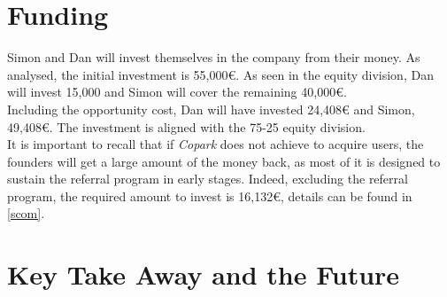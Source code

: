 \documentclass[12pt,a4paper,oneside]{book}
\newcommand{\bp}{\textit{Copark}}
\begin{document}
\section{Funding}
Simon and Dan will invest themselves in the company from their money. As analysed, the initial investment is 55,000\euro{}. As seen in the equity division, Dan will invest 15,000 and Simon will cover the remaining 40,000\euro{}.\\

Including the opportunity cost, Dan will have invested 24,408\euro{} and Simon, 49,408\euro{}. The investment is aligned with the 75-25 equity division.\\

It is important to recall that if \bp{} does not achieve to acquire users, the founders will get a large amount of the money back, as most of it is designed to sustain the referral program in early stages. Indeed, excluding the referral program, the required amount to invest is 16,132\euro{}, details can be found in \autoref{scom}.

\section{Key Take Away and the Future}
\end{document}
